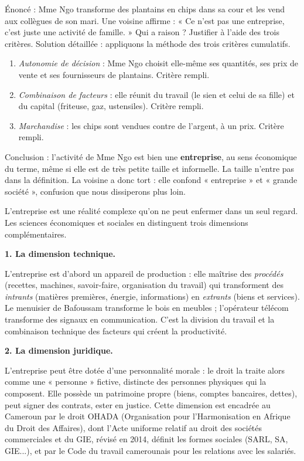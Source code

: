 \documentclass[11pt]{article}
\newcommand{\cle}[1]{{\popxbold\color{popdark}#1}}
\newcounter{popsec}
\newcounter{popsub}
\newcommand{\courssub}[1]{%
  \stepcounter{popsub}%
  \par\vspace{9pt}\noindent{\popxbold\fontsize{11.5}{13}\selectfont\color{popink}{\color{poporange}\thepopsec.\thepopsub}\hspace{6pt}#1}\par\nopagebreak\vspace{4pt}
}
\begin{document}
\begin{exoresolu}
Énoncé : Mme Ngo transforme des plantains en chips dans sa cour et les vend aux collègues de son mari. Une voisine affirme : « Ce n'est pas une entreprise, c'est juste une activité de famille. » Qui a raison ? Justifier à l'aide des trois critères.
\tcblower
Solution détaillée : appliquons la méthode des trois critères cumulatifs.
\begin{enumerate}
\item \emph{Autonomie de décision} : Mme Ngo choisit elle-même ses quantités, ses prix de vente et ses fournisseurs de plantains. Critère rempli.
\item \emph{Combinaison de facteurs} : elle réunit du travail (le sien et celui de sa fille) et du capital (friteuse, gaz, ustensiles). Critère rempli.
\item \emph{Marchandise} : les chips sont vendues contre de l'argent, à un prix. Critère rempli.
\end{enumerate}
Conclusion : l'activité de Mme Ngo est bien une \textbf{entreprise}, au sens économique du terme, même si elle est de très petite taille et informelle. La taille n'entre pas dans la définition. La voisine a donc tort : elle confond « entreprise » et « grande société », confusion que nous dissiperons plus loin.
\end{exoresolu}

\courssub{La triple dimension de l'entreprise}

L'entreprise est une réalité complexe qu'on ne peut enfermer dans un seul regard. Les sciences économiques et sociales en distinguent trois dimensions complémentaires.

\textbf{1. La dimension technique.}\par
L'entreprise est d'abord un \cle{appareil de production} : elle maîtrise des \emph{procédés} (recettes, machines, savoir-faire, organisation du travail) qui transforment des \emph{intrants} (matières premières, énergie, informations) en \emph{extrants} (biens et services). Le menuisier de Bafoussam transforme le bois en meubles ; l'opérateur télécom transforme des signaux en communication. C'est la division du travail et la combinaison technique des facteurs qui créent la \cle{productivité}.

\textbf{2. La dimension juridique.}\par
L'entreprise peut être dotée d'une \cle{personnalité morale} : le droit la traite alors comme une « personne » fictive, distincte des personnes physiques qui la composent. Elle possède un \cle{patrimoine propre} (biens, comptes bancaires, dettes), peut signer des contrats, ester en justice. Cette dimension est encadrée au Cameroun par le droit \cle{OHADA} (Organisation pour l'Harmonisation en Afrique du Droit des Affaires), dont l'Acte uniforme relatif au droit des sociétés commerciales et du GIE, révisé en 2014, définit les formes sociales (SARL, SA, GIE...), et par le Code du travail camerounais pour les relations avec les salariés.
\end{document}
